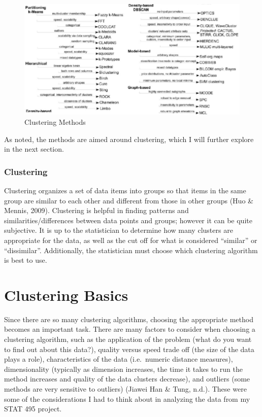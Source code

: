 \documentclass[12pt,twoside]{amherstthesis}
\begin{document}
  \begin{figure}[htbp]
  \centering
  \includegraphics[scale = 0.5,angle = 0]{clustering_methods.png}
  \caption[Clustering Methods]{\normalsize{Clustering Methods}}
  \label{fig:Clustering}
  \end{figure}
  
  As noted, the methods are aimed around clustering, which I will further
  explore in the next section.
  
  \subsection{Clustering}\label{clustering}
  
  Clustering organizes a set of data items into groups so that items in
  the same group are similar to each other and different from those in
  other groups (Huo \& Mennis, 2009). Clustering is helpful in finding
  patterns and similarities/differences between data points and groups;
  however it can be quite subjective. It is up to the statistician to
  determine how many clusters are appropriate for the data, as well as the
  cut off for what is considered ``similar'' or ``dissimilar''.
  Additionally, the statistician must choose which clustering algorithm is
  best to use.
  
  \chapter{Clustering Basics}\label{rmd-basics}
  
  Since there are so many clustering algorithms, choosing the appropriate
  method becomes an important task. There are many factors to consider
  when choosing a clustering algorithm, such as the application of the
  problem (what do you want to find out about this data?), quality versus
  speed trade off (the size of the data plays a role), characteristics of
  the data (i.e.~numeric distance measures), dimensionality (typically as
  dimension increases, the time it takes to run the method increases and
  quality of the data clusters decrease), and outliers (some methods are
  very sensitive to outliers) (Jiawei Han \& Tung, n.d.). These were some
  of the considerations I had to think about in analyzing the data from my
  STAT 495 project.
  
\end{document}
